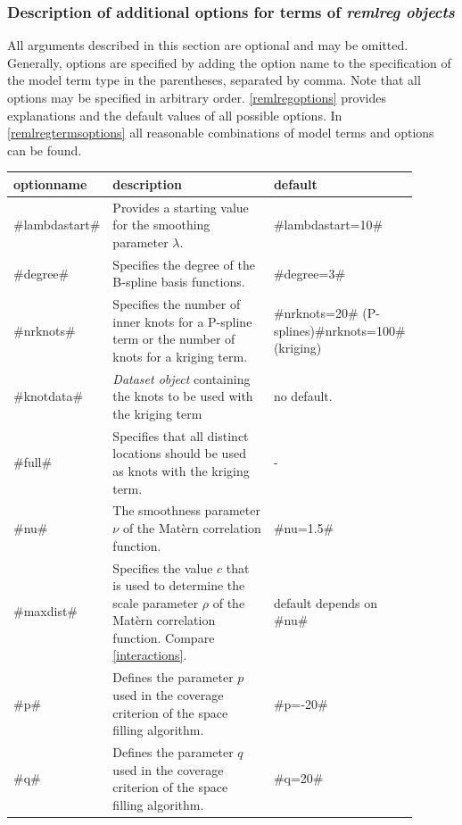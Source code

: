 \subsubsection{Description of additional options for terms of {\em remlreg objects}}
\label{remlreglocaloptions}

All arguments described in this section are optional and may be
omitted. Generally, options are specified by adding the option
name to the specification of the model term type in the
parentheses, separated by comma. Note that all options may be
specified in arbitrary order. \autoref{remlregoptions} provides
explanations and the default values of all possible options. In
\autoref{remlregtermsoptions} all reasonable combinations of model
terms and options can be found.

\begin{table}[ht] \footnotesize \centering
\begin{tabular}{|p{0.1\linewidth}|p{0.6\linewidth}|p{0.2\linewidth}|}
 \hline
 optionname & description & default\\
 \hline\hline
 #lambdastart# & Provides a starting value for the smoothing parameter $\lambda$. & #lambdastart=10# \\
 \hline
 #degree# & Specifies the degree of the B-spline basis functions. & #degree=3# \\
 \hline
 #nrknots# & Specifies the number of inner knots for a P-spline term or the number of knots for a kriging term. & #nrknots=20# (P-splines)\newline #nrknots=100# (kriging)  \\
 \hline
 #knotdata# & {\em Dataset object} containing the knots to be used
 with the kriging term & no default.\\
 \hline
 #full# & Specifies that all distinct locations should be used as
 knots with the kriging term. & -\\
 \hline
 #nu# & The smoothness parameter $\nu$ of the Mat{\`e}rn correlation function. & #nu=1.5# \\
 \hline
 #maxdist# & Specifies the value $c$ that is used to determine the scale parameter $\rho$ of the Mat{\`e}rn correlation function. Compare \autoref{interactions}. & default depends on #nu#\\
 \hline
 #p# & Defines the parameter $p$ used in the coverage criterion of the space filling algorithm. & #p=-20#\\
 \hline
 #q# & Defines the parameter $q$ used in the coverage criterion of the space filling algorithm. & #q=20#\\

\end{tabular}
\end{table}
